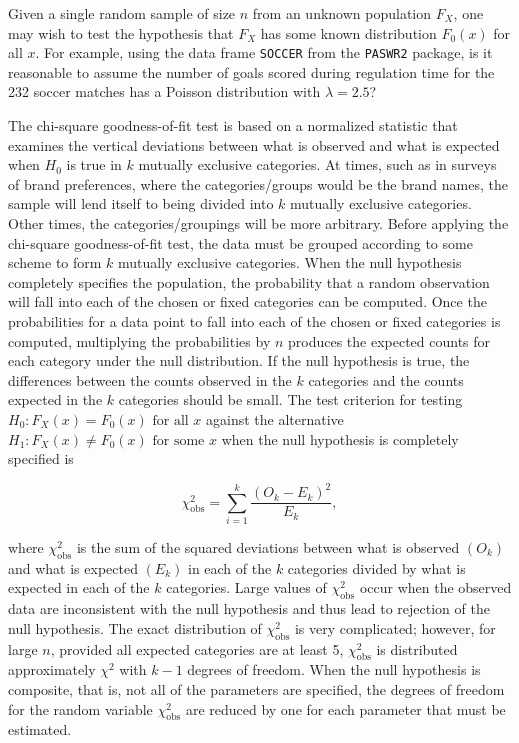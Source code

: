 \documentclass[
]{article}
\begin{document}
Given a single random sample of size \(n\) from an unknown population \(F_X\), one may wish to test the hypothesis that \(F_X\) has some known distribution \(F_0(x)\) for all \(x\). For example, using the data frame \texttt{SOCCER} from the \texttt{PASWR2} package, is it reasonable to assume the number of goals scored during regulation time for the 232 soccer matches has a Poisson distribution with \(\lambda=2.5\)?

The chi-square goodness-of-fit test is based on a normalized statistic that examines the vertical deviations between what is observed and what is expected when \(H_0\) is true in \(k\) mutually exclusive categories. At times, such as in surveys of brand preferences, where the categories/groups would be the brand names, the sample will lend itself to being divided into \(k\) mutually exclusive categories. Other times, the categories/groupings will be more arbitrary. Before applying the chi-square goodness-of-fit test, the data must be grouped according to some scheme to form \(k\) mutually exclusive categories. When the null hypothesis completely specifies the population, the probability that a random observation will fall into each of the chosen or fixed categories can be computed. Once the probabilities for a data point to fall into each of the chosen or fixed categories is computed, multiplying the probabilities by \(n\) produces the expected counts for each category under the null distribution. If the null hypothesis is true, the differences between the counts observed in the \(k\) categories and the counts expected in the \(k\) categories should be small. The test criterion for testing \(H_0: F_X(x) = F_0(x) \text{ for all } x\) against the alternative \(H_1: F_X(x) \ne F_0(x) \text{ for some } x\) when the null hypothesis is completely specified is

\begin{equation}
\chi_{\text{obs}}^2=\sum_{i=1}^{k} \frac{(O_k - E_k)^2}{E_k},
\label{eq:chiobs}
\end{equation}

where \(\chi_\text{obs}^2\) is the sum of the squared deviations between what is observed \((O_k)\) and what is expected \((E_k)\) in each of the \(k\) categories divided by what is expected in each of the \(k\) categories. Large values of \(\chi_\text{obs}^2\) occur when the observed data are inconsistent with the null hypothesis and thus lead to rejection of the null hypothesis. The exact distribution of \(\chi_\text{obs}^2\) is very complicated; however, for large \(n\), provided all expected categories are at least 5, \(\chi_\text{obs}^2\) is distributed approximately \(\chi^2\) with \(k-1\) degrees of freedom. When the null hypothesis is composite, that is, not all of the parameters are specified, the degrees of freedom for the random variable \(\chi_\text{obs}^2\) are reduced by one for each parameter that must be estimated.
\end{document}
